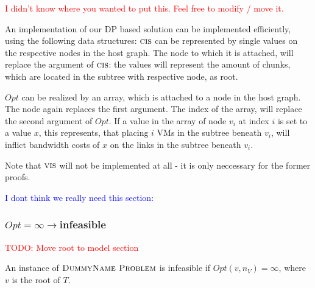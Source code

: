 \documentclass[9pt,twocolumn]{scrartcl}
\newcommand{\Problem}{\textsc{DummyName Problem}}
\newcommand{\carlo}[1]{\textcolor{red}{#1}}
\newcommand{\stefan}[1]{\textcolor{blue}{#1}}
\newcommand{\SubstrateNode}{\ensuremath{v}}
\newcommand{\Opt}{\ensuremath{Opt}}
\newcommand{\ChunkCount}{\ensuremath{\textsc{cis}}}
\newcommand{\VmCount}{\ensuremath{\textsc{vis}}}
\newcommand{\Tree}{\ensuremath{T}}
\newcommand{\Vms}{\ensuremath{n_V}}
\begin{document}
\carlo{I didn't know where you wanted to put this. Feel free to modify / move
it.}

An implementation of our DP based solution can be implemented efficiently,
using the following data structures: $\ChunkCount$ can be
represented by single values on the respective nodes in the host graph. The
node to which it is attached, will replace the argument of $\ChunkCount$: the
values will represent the amount of chunks, which are located in the subtree
with respective node, as root.

$\Opt$ can be realized by an array, which is attached to a node in the host
graph. The node again replaces the first argument. The index of the array, will
replace the second argument of $\Opt$. If a value in the array of node
$\SubstrateNode_i$ at index $i$ is set to a value $x$, this represents, that
placing $i$ VMs in the subtree beneath $\SubstrateNode_i$, will inflict
bandwidth costs of $x$ on the links in the subtree beneath $\SubstrateNode_i$.

Note that $\VmCount$ will not be implemented at all - it is only neccessary for
the former proofs.

\stefan{I dont think we really need this section:}

\subsubsection{$\Opt = \infty \rightarrow $infeasible}

\carlo{TODO: Move root to model section}

\begin{lemma}
An instance of $\Problem$ is infeasible if $\Opt(\SubstrateNode,\Vms) = \infty$,
where $\SubstrateNode$ is the root of $\Tree$.
\end{lemma}
\end{document}
